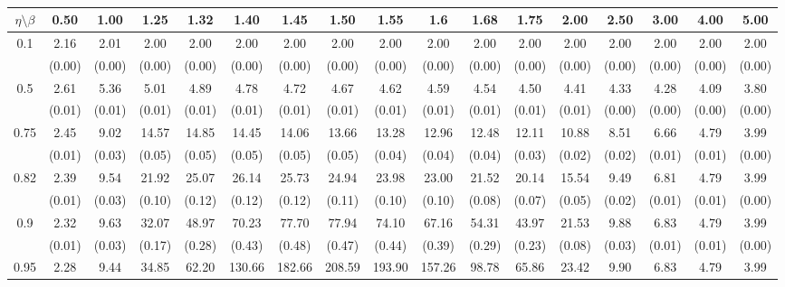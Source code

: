 \documentclass[12pt]{article}  %
\theoremstyle{plain}
\begin{document}
\begin{sidewaystable}[htbp]
\centering
{}
\ \\
\begin{tabular}{ccccccccccccccccc}
\hline
$\eta \setminus \beta $        & 0.50   & 1.00   & 1.25   & 1.32   & 1.40   & 1.45   & 1.50   & 1.55   & 1.6   & 1.68   & 1.75   & 2.00   & 2.50   & 3.00   & 4.00  &5.00 \\ \hline
\multirow{2}{*}{0.1}  & 2.16 &2.01  &2.00 & 2.00 &  2.00  & 2.00  & 2.00  & 2.00  & 2.00 &  2.00&  2.00&  2.00 & 2.00&  2.00 & 2.00 & 2.00  \\
                      & (0.00) & (0.00) & (0.00) & (0.00) & (0.00) & (0.00) & (0.00) & (0.00) & (0.00) & (0.00) & (0.00) & (0.00) & (0.00) & (0.00) & (0.00) & (0.00)\\ \hline
\multirow{2}{*}{0.5}  & 2.61 &5.36 & 5.01 & 4.89  & 4.78 &  4.72  & 4.67  & 4.62 &  4.59 &  4.54 & 4.50 & 4.41 & 4.33 & 4.28 & 4.09 & 3.80 \\
                      & (0.01) & (0.01) & (0.01) & (0.01) & (0.01) & (0.01) & (0.01) & (0.01) & (0.01) & (0.01) & (0.01) & (0.01)  & (0.00) & (0.00) & (0.00)&(0.00)\\ \hline
\multirow{2}{*}{0.75}  & 2.45 &9.02& 14.57 &14.85 & 14.45 & 14.06 & 13.66 & 13.28  &12.96 & 12.48 &12.11 &10.88 & 8.51 & 6.66 & 4.79 & 3.99\\
                      & (0.01)& (0.03)& (0.05)& (0.05)& (0.05)& (0.05)& (0.05)& (0.04)& (0.04)& (0.04)&  (0.03)&  (0.02)&  (0.02)& (0.01)&  (0.01)&     (0.00)\\ \hline
\multirow{2}{*}{0.82}  & 2.39& 9.54 &21.92 &25.07 & 26.14 & 25.73 & 24.94 & 23.98 & 23.00 & 21.52& 20.14& 15.54 & 9.49 & 6.81 & 4.79 & 3.99\\
                      & (0.01)& (0.03)& (0.10)& (0.12)& (0.12)& (0.12)& (0.11)& (0.10)& (0.10)&  (0.08)&  (0.07)&  (0.05)&  (0.02)&  (0.01)&  (0.01)&   (0.00)\\ \hline
\multirow{2}{*}{0.9}  & 2.32 &9.63& 32.07 &48.97 & 70.23 & 77.70 & 77.94 & 74.10 & 67.16 & 54.31& 43.97 &21.53 & 9.88 & 6.83 & 4.79 & 3.99\\
                      & (0.01)& (0.03)& (0.17)& (0.28)& (0.43)& (0.48)& (0.47)& (0.44)& (0.39)&  (0.29)&  (0.23)&  (0.08)&  (0.03)&  (0.01)&  (0.01)&     (0.00)\\ \hline                                               
\multirow{2}{*}{0.95}  & 2.28 &9.44& 34.85& 62.20 &130.66& 182.66& 208.59 &193.90 &157.26 & 98.78 &65.86 &23.42  &9.90  &6.83  &4.79  &3.99\\

\end{tabular}
\end{sidewaystable}
\end{document}

